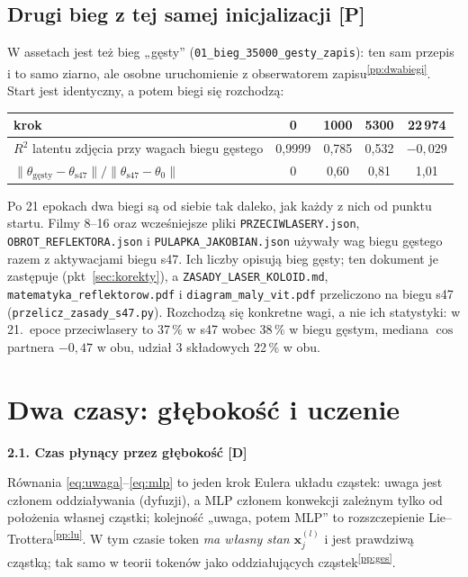 \documentclass[a4paper,11pt]{article}
\newcommand{\stD}{\textcolor{dok}{\textsf{\textbf{[D]}}}}
\newcommand{\stP}{\textcolor{pom}{\textsf{\textbf{[P]}}}}
\newcommand{\pp}[1]{\textsuperscript{\ref{pp:#1}}}
\newcommand{\elem}[1]{\par\medskip\noindent\textbf{#1}\par\nopagebreak}
\begin{document}
\subsection{Drugi bieg z tej samej inicjalizacji \stP}\label{sec:dwa}
W assetach jest też bieg „gęsty” (\texttt{01\_bieg\_35000\_gesty\_zapis}): ten sam przepis i to samo ziarno, ale osobne uruchomienie
z obserwatorem zapisu\pp{dwabiegi}. Start jest identyczny, a potem biegi się rozchodzą:
\begin{center}
\begin{tabular}{lcccc}\toprule
krok & 0 & 1000 & 5300 & 22\,974\\\midrule
$R^2$ latentu zdjęcia przy wagach biegu gęstego & 0,9999 & 0,785 & 0,532 & $-0{,}029$\\
$\lVert\theta_{\text{gęsty}}-\theta_{\text{s47}}\rVert / \lVert\theta_{\text{s47}}-\theta_0\rVert$ & 0 & 0,60 & 0,81 & 1,01\\\bottomrule
\end{tabular}
\end{center}
Po 21 epokach dwa biegi są od siebie tak daleko, jak każdy z nich od punktu startu. Filmy 8--16 oraz wcześniejsze pliki
\texttt{PRZECIWLASERY.json}, \texttt{OBROT\_REFLEKTORA.json} i \texttt{PULAPKA\_JAKOBIAN.json} używały wag biegu gęstego razem
z aktywacjami biegu s47. Ich liczby opisują bieg gęsty; ten dokument je zastępuje (pkt~\ref{sec:korekty}), a
\texttt{ZASADY\_LASER\_KOLOID.md}, \texttt{matematyka\_reflektorow.pdf} i \texttt{diagram\_maly\_vit.pdf} przeliczono na biegu s47
(\texttt{przelicz\_zasady\_s47.py}). Rozchodzą się konkretne wagi, a nie ich statystyki: w 21.~epoce przeciwlasery to 37\,\% w s47
wobec 38\,\% w biegu gęstym, mediana $\cos$ partnera $-0{,}47$ w obu, udział 3 składowych 22\,\% w obu.

\section{Dwa czasy: głębokość i uczenie}\label{sec:czasy}
\elem{2.1. Czas płynący przez głębokość \stD}
Równania \eqref{eq:uwaga}--\eqref{eq:mlp} to jeden krok Eulera układu cząstek: uwaga jest członem oddziaływania (dyfuzji),
a MLP członem konwekcji zależnym tylko od położenia własnej cząstki; kolejność „uwaga, potem MLP” to rozszczepienie
Lie--Trottera\pp{lu}. W tym czasie token \emph{ma własny stan} $\bm x_j^{(l)}$ i jest prawdziwą cząstką; tak samo w teorii
tokenów jako oddziałujących cząstek\pp{ges}.
\end{document}

